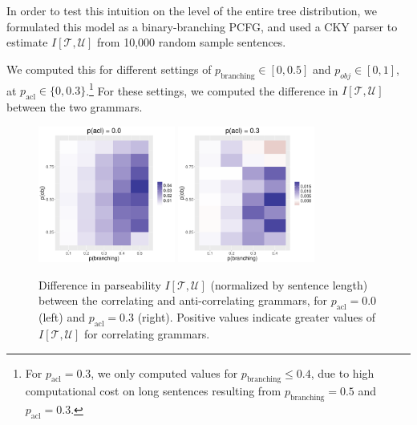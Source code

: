 \documentclass[10pt,twoside,lineno]{article}
\begin{document}
In order to test this intuition on the level of the entire tree distribution, we formulated this model as a binary-branching PCFG, and used a CKY parser to estimate $I[\mathcal{T}, \mathcal{U}]$ from 10,000 random sample sentences.

We computed this for different settings of $p_\text{branching} \in [0, 0.5]$ and $p_{obj} \in [0,1]$, at $p_\text{acl} \in \{0, 0.3\}$.\footnote{For $p_\text{acl} = 0.3$, we only computed values for $p_\text{branching} \leq 0.4$, due to high computational cost on long sentences resulting from $p_\text{branching} = 0.5$ and $p_\text{acl} = 0.3$.}
For these settings, we computed the difference in $I[\mathcal{T}, \mathcal{U}]$ between the two grammars.




\begin{figure}
	\begin{center}	
\includegraphics[width=0.4\textwidth]{../models/revision/toy_simulations/result_NPBranching0_0.pdf}
\includegraphics[width=0.4\textwidth]{../models/revision/toy_simulations/result_NPBranching0_3.pdf}
\end{center}

	\caption{Difference in parseability $I[\mathcal{T}, \mathcal{U}]$ (normalized by sentence length) between the correlating and anti-correlating grammars, for $p_\text{acl} = 0.0$ (left) and $p_\text{acl} = 0.3$ (right). Positive values indicate greater values of $I[\mathcal{T}, \mathcal{U}]$ for correlating grammars.}\label{fig:toy-parseability}
\end{figure}
\end{document}
